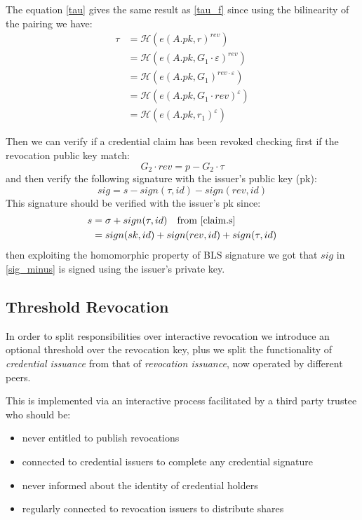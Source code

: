 \documentclass[conference]{IEEEtran}
\begin{document}
The equation \eqref{tau} gives the same result as \eqref{tau_f} since using the bilinearity of the pairing \cite{tripartite} we have:
\begin{equation*}
    \begin{split}
        \tau &= \mathcal{H}(e(A.pk, r)^{rev}) \\
        &= \mathcal{H}(e(A.pk, G_1 \cdot \varepsilon)^{rev}) \\
        &= \mathcal{H}(e(A.pk, G_1)^{rev \cdot \varepsilon}) \\
        &= \mathcal{H}(e(A.pk, G_1 \cdot rev)^{\varepsilon}) \\
        &= \mathcal{H}(e(A.pk, r_1)^{\varepsilon})
    \end{split}
\end{equation*}

Then we can verify if a credential claim has been revoked checking first if the revocation public key match:
\begin{equation*}
    G_2 \cdot rev = p - G_2 \cdot \tau
\end{equation*}
and then verify the following signature with the issuer's public key (pk):
\begin{equation}\label{sig_minus}
    sig = s - sign(\tau, id) - sign(rev, id)
\end{equation}
This signature should be verified with the issuer's pk since:
\begin{equation*}
    \begin{split}
        s &= \sigma + sign(\tau, id) \quad \text{from \eqref{claim.s}} \\
        &=  sign(sk, id) + sign(rev, id) + sign(\tau, id)
    \end{split}
\end{equation*}
then exploiting the homomorphic property of BLS signature
we got that $sig$ in \eqref{sig_minus} is signed using the issuer's private key.

\subsection{Threshold Revocation}

In order to split responsibilities over interactive revocation we introduce an optional threshold over the revocation key, plus we split the functionality of \textit{credential issuance} from that of \textit{revocation issuance}, now operated by different peers.

This is implemented via an interactive process facilitated by a third party trustee who should be:
\begin{itemize}
    \item never entitled to publish revocations
    \item connected to credential issuers to complete any credential signature
    \item never informed about the identity of credential holders
    \item regularly connected to revocation issuers to distribute shares
\end{itemize}
\end{document}
